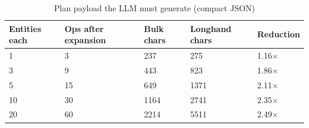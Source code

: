 \begin{table}[t]
\centering
\small
\begin{tabular}{lllll}
\toprule
Entities each & Ops after expansion & Bulk chars & Longhand chars & Reduction \\
\midrule
1 & 3 & 237 & 275 & 1.16$\times$ \\
3 & 9 & 443 & 823 & 1.86$\times$ \\
5 & 15 & 649 & 1371 & 2.11$\times$ \\
10 & 30 & 1164 & 2741 & 2.35$\times$ \\
20 & 60 & 2214 & 5511 & 2.49$\times$ \\
\bottomrule
\end{tabular}
\caption{Plan payload the LLM must generate (compact JSON)}
\label{tab:t13-payload}
\end{table}
